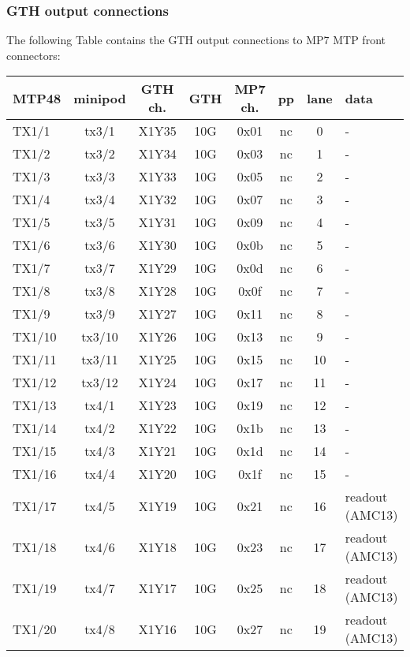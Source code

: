 \subsubsection{GTH output connections}\label{sec:app:gth_o_conn}

The following Table contains the GTH output connections to MP7 MTP front connectors:

\begin{longtable}{|l|c|c|c|c|c|c|l|}
\hline
\textbf{MTP48}& \textbf{minipod}& \textbf{GTH ch.}& \textbf{GTH}& \textbf{MP7 ch.} &\textbf{pp}& \textbf{lane}& \textbf{data}\\
\hline
\hline
\endhead
TX1/1  & tx3/1  & X1Y35 & 10G & 0x01 & nc & 0  & -\\\hline
TX1/2  & tx3/2  & X1Y34 & 10G & 0x03 & nc & 1  & -\\\hline
TX1/3  & tx3/3  & X1Y33 & 10G & 0x05 & nc & 2  & -\\\hline
TX1/4  & tx3/4  & X1Y32 & 10G & 0x07 & nc & 3  & -\\\hline
TX1/5  & tx3/5  & X1Y31 & 10G & 0x09 & nc & 4  & -\\\hline
TX1/6  & tx3/6  & X1Y30 & 10G & 0x0b & nc & 5  & -\\\hline
TX1/7  & tx3/7  & X1Y29 & 10G & 0x0d & nc & 6  & -\\\hline
TX1/8  & tx3/8  & X1Y28 & 10G & 0x0f & nc & 7  & -\\\hline
TX1/9  & tx3/9  & X1Y27 & 10G & 0x11 & nc & 8  & -\\\hline
TX1/10 & tx3/10 & X1Y26 & 10G & 0x13 & nc & 9  & -\\\hline
TX1/11 & tx3/11 & X1Y25 & 10G & 0x15 & nc & 10 & -\\\hline
TX1/12 & tx3/12 & X1Y24 & 10G & 0x17 & nc & 11 & -\\\hline
TX1/13 & tx4/1  & X1Y23 & 10G & 0x19 & nc & 12 & -\\\hline
TX1/14 & tx4/2  & X1Y22 & 10G & 0x1b & nc & 13 & -\\\hline
TX1/15 & tx4/3  & X1Y21 & 10G & 0x1d & nc & 14 & -\\\hline
TX1/16 & tx4/4  & X1Y20 & 10G & 0x1f & nc & 15 & -\\\hline
TX1/17 & tx4/5  & X1Y19 & 10G & 0x21 & nc & 16 & readout (AMC13)\\\hline
TX1/18 & tx4/6  & X1Y18 & 10G & 0x23 & nc & 17 & readout (AMC13)\\\hline
TX1/19 & tx4/7  & X1Y17 & 10G & 0x25 & nc & 18 & readout (AMC13)\\\hline
TX1/20 & tx4/8  & X1Y16 & 10G & 0x27 & nc & 19 & readout (AMC13)\\\hline

\end{longtable}
